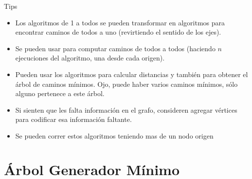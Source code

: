 \documentclass{beamer}
\begin{document}
\begin{frame}{Tips}
	\begin{itemize}
		\item Los algoritmos de 1 a todos se pueden transformar en algoritmos para encontrar caminos de todos a uno (revirtiendo el sentido de los ejes).
		\item Se pueden usar para computar caminos de todos a todos (haciendo $n$ ejecuciones del algoritmo, una desde cada origen).
		\item Pueden usar los algoritmos para calcular distancias y también para obtener el árbol de caminos mínimos. Ojo, puede haber varios caminos mínimos, sólo alguno pertenece a este árbol.
		\item Si sienten que les falta información en el grafo, consideren agregar vértices para codificar esa información faltante.
		\item Se pueden correr estos algoritmos teniendo mas de un nodo origen
	\end{itemize}
\end{frame}




\section{Árbol Generador Mínimo}
\end{document}
